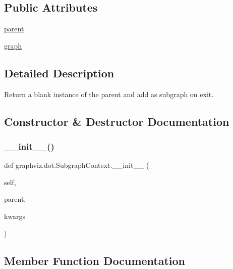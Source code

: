 \subsection*{Public Attributes}
\begin{DoxyCompactItemize}
\item 
\hyperlink{classgraphviz_1_1dot_1_1SubgraphContext_aa3bf4e4942c5284cef208a9860a505bc}{parent}
\item 
\hyperlink{classgraphviz_1_1dot_1_1SubgraphContext_a4e59ad3db72ede6c1d1cc0522416f624}{graph}
\end{DoxyCompactItemize}


\subsection{Detailed Description}
\begin{DoxyVerb}Return a blank instance of the parent and add as subgraph on exit.\end{DoxyVerb}
 

\subsection{Constructor \& Destructor Documentation}
\mbox{\label{classgraphviz_1_1dot_1_1SubgraphContext_a21decf23b0de98b7607e862e18b0ed0f}} 
\subsubsection{\texorpdfstring{\+\_\+\+\_\+init\+\_\+\+\_\+()}{\_\_init\_\_()}}
{\footnotesize\ttfamily def graphviz.\+dot.\+Subgraph\+Context.\+\_\+\+\_\+init\+\_\+\+\_\+ (\begin{DoxyParamCaption}\item[{}]{self,  }\item[{}]{parent,  }\item[{}]{kwargs }\end{DoxyParamCaption})}



\subsection{Member Function Documentation}
\mbox{\label{classgraphviz_1_1dot_1_1SubgraphContext_a8460605457b3e9e9ab23e64f590d8c35}} 
